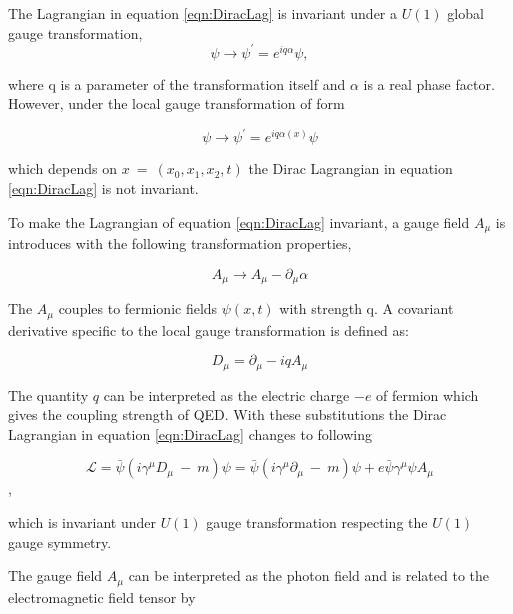 The Lagrangian in equation \ref{eqn:DiracLag} is invariant under a $U(1)$ global gauge transformation, 
\begin{equation}
\psi\rightarrow \psi^{'}=e^{iq\alpha}\psi, 
\label{eqn:QEDGlobalTrans}
\end{equation}

where q is a parameter of the transformation itself and $\alpha$ is a real phase factor. However, under the local gauge transformation of form 

\begin{equation}
\psi\rightarrow \psi^{'}=e^{iq\alpha(x)}\psi
\label{eqn:QEDLocalTrans}
\end{equation}

which depends on $x~=~(x_{0},x_{1},x_{2},t)$ the Dirac Lagrangian in equation \ref{eqn:DiracLag} is not invariant. 

To make the Lagrangian of equation \ref{eqn:DiracLag} invariant, a gauge field $A_{\mu}$ is introduces with the following transformation properties, 

\begin{equation}
A_{\mu}\rightarrow A_{\mu} - \partial _{\mu} \alpha
\label{eqn:QEDGaugeField}
\end{equation}  

The $A_{\mu}$ couples to fermionic fields $\psi(x,t)$ with strength q. A covariant derivative specific to the local gauge transformation is defined as:

\begin{equation}
D_{\mu} = \partial_{\mu} - iqA_{\mu}
\label{eqn:QEDCovDerv}
\end{equation}  

The quantity $q$ can be interpreted as the electric charge $-e$ of fermion which gives the coupling strength of QED. With these substitutions the Dirac Lagrangian in equation \ref{eqn:DiracLag} changes to following

\begin{equation}
\mathcal{L} = \bar{\psi} ( i \gamma^{\mu} D_{\mu} ~-~ m) \psi = \bar{\psi} ( i \gamma^{\mu} \partial_{\mu} ~-~ m) \psi + e\bar{\psi} \gamma^{\mu} \psi A_{\mu}
\label{eqn:QEDInvLag}
\end{equation},

which is invariant under $U(1)$ gauge transformation respecting the $U(1)$ gauge symmetry. 

The gauge field $A_{\mu}$ can be interpreted as the photon field and is related to the electromagnetic field tensor by

